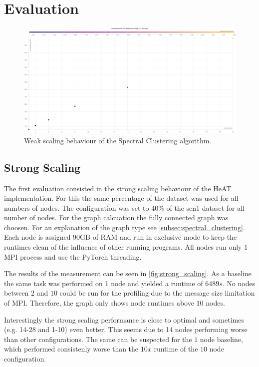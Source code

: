 \section{Evaluation}
\label{sec:evaluation}


\begin{figure}
  \includegraphics[width=0.9\linewidth]{images/weak_scaling_chart.png}
  \caption{Weak scaling behaviour of the Spectral Clustering algorithm.}\label{fig:weak_scaling}
\end{figure}


\subsection{Strong Scaling}
\label{subsec:strong_scaling}


The first evaluation consisted in the strong scaling behaviour of the \gls{HeAT} implementation.
For this the same percentage of the dataset was used for all numbers of nodes.
The configuration was set to 40\% of the sen1 dataset for all number of nodes. For the graph calcuation the fully connected graph was choosen. For an explanation of the graph type
see \cref{subsec:spectral_clustering}.
Each node is assigned 90GB of RAM and run in exclusive mode to keep the runtimes clean of the influence of other running programs.
All nodes run only 1 MPI process and use the PyTorch threading.

The results of the measurement can be seen in \cref{fig:strong_scaling}. As a baseline the same task was performed on 1 node and yielded a runtime of \(6489s\).
No nodes between \(2\) and \(10\) could be run for the profiling due to the message size limitation of \gls{MPI}.
Therefore, the graph only shows node runtimes above \(10\) nodes.

Interestingly the strong scaling performance is close to optimal and sometimes (e.g. 14-28 and 1-10) even better.
This seems due to 14 nodes performing worse than other configurations.
The same can be suspected for the \(1\) node baseline, which performed consistenly worse than the \(10x\) runtime of the \(10\) node configuration.




